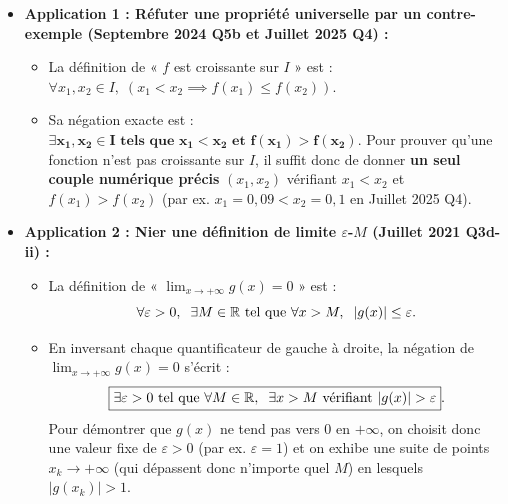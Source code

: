 \begin{itemize}
    \item \textbf{Application 1 : Réfuter une propriété universelle par un contre-exemple (Septembre 2024 Q5b et Juillet 2025 Q4) :}
    \begin{itemize}
        \item La définition de « $f$ est croissante sur $I$ » est : $\forall x_1, x_2 \in I,\; (x_1 < x_2 \implies f(x_1) \le f(x_2))$.
        \item Sa négation exacte est : $\mathbf{\exists x_1, x_2 \in I \text{ tels que } x_1 < x_2 \text{ et } f(x_1) > f(x_2)}$. Pour prouver qu'une fonction n'est pas croissante sur $I$, il suffit donc de donner \textbf{un seul couple numérique précis} $(x_1, x_2)$ vérifiant $x_1 < x_2$ et $f(x_1) > f(x_2)$ (par ex. $x_1 = 0,09 < x_2 = 0,1$ en Juillet 2025 Q4).
    \end{itemize}
    \item \textbf{Application 2 : Nier une définition de limite $\varepsilon$-$M$ (Juillet 2021 Q3d-ii) :}
    \begin{itemize}
        \item La définition de « $\lim_{x \to +\infty} g(x) = 0$ » est :
        \[
            \forall \varepsilon > 0, \;\; \exists M \in \mathbb{R} \text{ tel que } \forall x > M, \;\; |g(x)| \le \varepsilon.
        \]
        \item En inversant chaque quantificateur de gauche à droite, la négation de $\lim_{x \to +\infty} g(x) = 0$ s'écrit :
        \[
            \boxed{\exists \varepsilon > 0 \text{ tel que } \forall M \in \mathbb{R}, \;\; \exists x > M \text{ vérifiant } |g(x)| > \varepsilon}.
        \]
        Pour démontrer que $g(x)$ ne tend pas vers $0$ en $+\infty$, on choisit donc une valeur fixe de $\varepsilon > 0$ (par ex. $\varepsilon = 1$) et on exhibe une suite de points $x_k \to +\infty$ (qui dépassent donc n'importe quel $M$) en lesquels $|g(x_k)| > 1$.
    \end{itemize}
\end{itemize}
